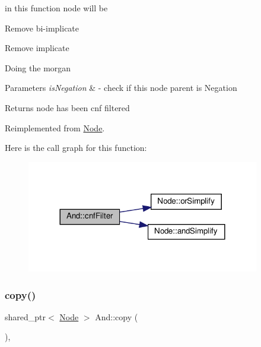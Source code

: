 in this function node will be 


\begin{DoxyItemize}
\item Remove bi-\/implicate
\item Remove implicate
\item Doing the morgan 
\begin{DoxyParams}{Parameters}
{\em is\+Negation} & -\/ check if this node parent is Negation \\
\hline
\end{DoxyParams}
\begin{DoxyReturn}{Returns}
node has been cnf filtered 
\end{DoxyReturn}

\end{DoxyItemize}

Reimplemented from \hyperlink{class_node_ab5b01fd3c4efe0f2eaf7fc41653359b7}{Node}.

Here is the call graph for this function\+:\nopagebreak
\begin{figure}[H]
\begin{center}
\leavevmode
\includegraphics[width=288pt]{d0/dc9/class_and_a18ea23cd682dce93808c34ea0243897f_cgraph}
\end{center}
\end{figure}
\mbox{\label{class_and_a7560a861ae68050c2aa22e2392a46a15}} 
\subsubsection{\texorpdfstring{copy()}{copy()}}
{\footnotesize\ttfamily shared\+\_\+ptr$<$ \hyperlink{class_node}{Node} $>$ And\+::copy (\begin{DoxyParamCaption}{ }\end{DoxyParamCaption})\hspace{0.3cm}{\ttfamily [override]}, {\ttfamily [virtual]}}



